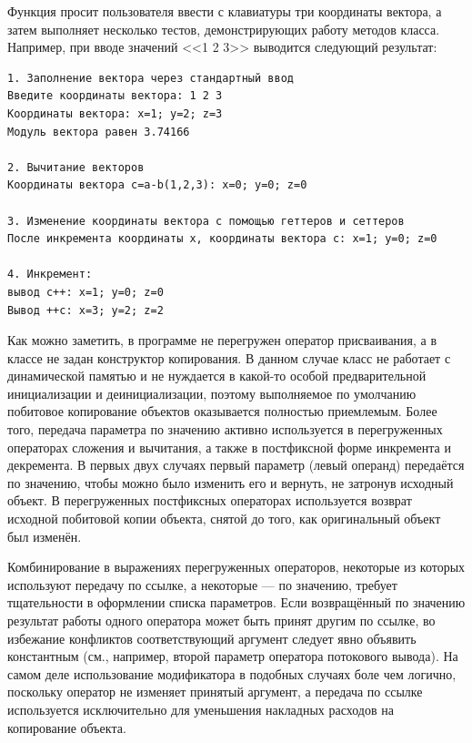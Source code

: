 Функция  просит пользователя ввести с клавиатуры три
координаты вектора, а затем выполняет несколько тестов, демонстрирующих работу методов класса. Например, при вводе
значений <<1 2 3>> выводится следующий результат:
\begin{verbatim}
1. Заполнение вектора через стандартный ввод 
Введите координаты вектора: 1 2 3 
Координаты вектора: x=1; y=2; z=3 
Модуль вектора равен 3.74166 

2. Вычитание векторов 
Координаты вектора с=a-b(1,2,3): x=0; y=0; z=0 

3. Изменение координаты вектора с помощью геттеров и сеттеров 
После инкремента координаты x, координаты вектора c: x=1; y=0; z=0 

4. Инкремент: 
вывод с++: x=1; y=0; z=0 
Вывод ++с: x=3; y=2; z=2
\end{verbatim}


Как можно заметить, в программе не перегружен оператор присваивания, а в классе
 не задан конструктор копирования. В данном случае класс не
работает с динамической памятью и не нуждается в какой-то особой предварительной инициализации и деинициализации,
поэтому выполняемое по умолчанию побитовое копирование объектов оказывается полностью приемлемым. Более того, передача
параметра по значению активно используется в перегруженных операторах сложения и вычитания, а также в постфиксной форме
инкремента и декремента. В первых двух случаях первый параметр (левый операнд) передаётся по значению, чтобы можно было
изменить его и вернуть, не затронув исходный объект. В перегруженных постфиксных операторах используется возврат
исходной побитовой копии объекта, снятой до того, как оригинальный объект был изменён.

Комбинирование в выражениях перегруженных операторов, некоторые из которых используют передачу по
ссылке, а некоторые --- по значению, требует тщательности в оформлении списка параметров. Если возвращённый по значению
результат работы одного оператора может быть принят другим по ссылке, во избежание конфликтов соответствующий аргумент
следует явно объявить константным (см., например, второй параметр оператора потокового вывода). На самом деле
использование модификатора  в подобных случаях боле чем логично,
поскольку оператор не изменяет принятый аргумент, а передача по ссылке используется исключительно для уменьшения
накладных расходов на копирование объекта.

